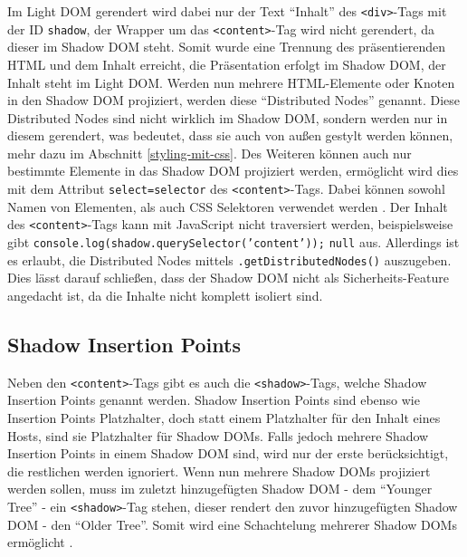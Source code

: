 Im Light \ac{DOM} gerendert wird dabei nur der Text ``Inhalt'' des \texttt{\textless{}div\textgreater{}}-Tags mit der ID \texttt{shadow}, der Wrapper um das \texttt{\textless{}content\textgreater{}}-Tag wird nicht gerendert, da dieser im Shadow \ac{DOM} steht. Somit wurde eine Trennung des präsentierenden \ac{HTML} und dem Inhalt erreicht, die Präsentation erfolgt im Shadow \ac{DOM}, der Inhalt steht im Light \ac{DOM}. Werden nun mehrere \ac{HTML}-Elemente oder Knoten in den Shadow \ac{DOM} projiziert, werden diese ``Distributed Nodes'' genannt. Diese Distributed Nodes sind nicht wirklich im Shadow \ac{DOM}, sondern werden nur in diesem gerendert, was bedeutet, dass sie auch von außen gestylt werden können, mehr dazu im Abschnitt \ref{styling-mit-css}. Des Weiteren können auch nur bestimmte Elemente in das Shadow \ac{DOM} projiziert werden, ermöglicht wird dies mit dem Attribut \texttt{select=\dq selector\dq} des \texttt{\textless{}content\textgreater{}}-Tags. Dabei können sowohl Namen von Elementen, als auch \ac{CSS} Selektoren verwendet werden \cite{citeulike:13851402}. Der Inhalt des \texttt{\textless{}content\textgreater{}}-Tags kann mit JavaScript nicht traversiert werden, beispielsweise gibt \texttt{console.log(shadow.querySelector('content'));} \texttt{null} aus. Allerdings ist es erlaubt, die Distributed Nodes mittels \texttt{.getDistributedNodes()} auszugeben. Dies lässt darauf schließen, dass der Shadow \ac{DOM} nicht als Sicherheits-Feature angedacht ist, da die Inhalte nicht komplett isoliert sind.

\subsection{Shadow Insertion Points}\label{shadow-insertion-points}

Neben den \texttt{\textless{}content\textgreater{}}-Tags gibt es auch die \texttt{\textless{}shadow\textgreater{}}-Tags, welche Shadow Insertion Points genannt werden. Shadow Insertion Points sind ebenso wie Insertion Points Platzhalter, doch statt einem Platzhalter für den Inhalt eines Hosts, sind sie Platzhalter für Shadow \ac{DOM}s. Falls jedoch mehrere Shadow Insertion Points in einem Shadow \ac{DOM} sind, wird nur der erste berücksichtigt, die restlichen werden ignoriert. Wenn nun mehrere Shadow \ac{DOM}s projiziert werden sollen, muss im zuletzt hinzugefügten Shadow \ac{DOM} - dem ``Younger Tree'' - ein \texttt{\textless{}shadow\textgreater{}}-Tag stehen, dieser rendert den zuvor hinzugefügten Shadow \ac{DOM} - den ``Older Tree''. Somit wird eine Schachtelung mehrerer Shadow \ac{DOM}s ermöglicht \cite{citeulike:13851421}.

